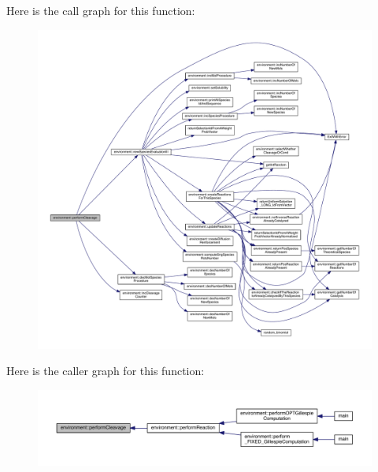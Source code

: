 Here is the call graph for this function\+:\nopagebreak
\begin{figure}[H]
\begin{center}
\leavevmode
\includegraphics[width=350pt]{a00013_aa4ed307a123c402166cfc7f6ed99043a_cgraph}
\end{center}
\end{figure}




Here is the caller graph for this function\+:\nopagebreak
\begin{figure}[H]
\begin{center}
\leavevmode
\includegraphics[width=350pt]{a00013_aa4ed307a123c402166cfc7f6ed99043a_icgraph}
\end{center}
\end{figure}


